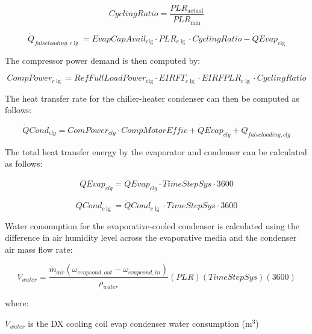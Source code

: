 \begin{equation}
CyclingRatio = \frac{{PL{R_{{\mathrm{actual}}}}}}{{PL{R_{{\mathrm{min}}}}}}
\end{equation}

\begin{equation}
{\dot Q_{falseloading,c\lg }} = EvapCapAvai{l_{{\mathrm{clg}}}} \cdot PL{R_{c\lg }} \cdot CyclingRatio - \dot QEva{p_{{\mathrm{clg}}}}
\end{equation}

The compressor power demand is then computed by:

\begin{equation}
CompPowe{r_{c\lg }} = RefFullLoadPowe{r_{{\mathrm{clg}}}} \cdot {\mathrm{ }}EIRF{T_{c\lg }}{\mathrm{ }} \cdot EIRFPL{R_{c\lg }} \cdot CyclingRatio
\end{equation}

The heat transfer rate for the chiller-heater condenser can then be computed as follows:

\begin{equation}
\dot QCon{d_{clg}} = ComPowe{r_{clg}} \cdot CompMotorEffic + \dot QEva{p_{clg}} + {\dot Q_{falseloading,clg}}
\end{equation}

The total heat transfer energy by the evaporator and condenser can be calculated as follows:

\begin{equation}
QEva{p_{clg}} = \dot QEva{p_{clg}} \cdot TimeStepSys \cdot 3600
\end{equation}

\begin{equation}
QCon{d_{c\lg }} = \dot QCon{d_{c\lg }} \cdot TimeStepSys \cdot 3600
\end{equation}

Water consumption for the evaporative-cooled condenser is calculated using the difference in air humidity level across the evaporative media and the condenser air mass flow rate:

\begin{equation}
{V_{water}} = \frac{{{{\dot{m}_{air}}\left( {{\omega_{evapcond,out}} - {\omega_{evapcond,in}}} \right)}}}{{{\rho_{water}}}}\left( {PLR} \right)\left( {TimeStepSys} \right)\left( {3600} \right)
\end{equation}

where:

\({V_{water}}\) is the DX cooling coil evap condenser water consumption (m\(^{3}\))


